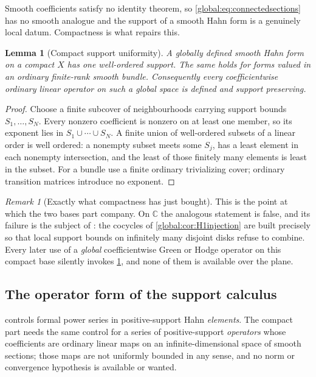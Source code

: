 \documentclass[11pt,letterpaper]{article}
\newtheorem{lemma}[lemma]{Lemma}
\theoremstyle{definition}
\theoremstyle{remark}
\newtheorem{remark}[remark]{Remark}
\newcommand{\C}{\mathbb C}
\numberwithin{equation}{section}
\begin{document}
Smooth coefficients satisfy no identity theorem, so \eqref{global:eq:connectedsections} has no smooth analogue and the support of a smooth Hahn form is a genuinely local datum. Compactness is what repairs this.

\begin{lemma}[Compact support uniformity]\label{global:lem:compactsupport}
A globally defined smooth Hahn form on a compact $X$ has one well-ordered support. The same holds for forms valued in an ordinary finite-rank smooth bundle. Consequently every coefficientwise ordinary linear operator on such a global space is defined and support preserving.
\end{lemma}

\begin{proof}
Choose a finite subcover of neighbourhoods carrying support bounds $S_1,\dots,S_N$. Every nonzero coefficient is nonzero on at least one member, so its exponent lies in $S_1\cup\cdots\cup S_N$. A finite union of well-ordered subsets of a linear order is well ordered: a nonempty subset meets some $S_j$, has a least element in each nonempty intersection, and the least of those finitely many elements is least in the subset. For a bundle use a finite ordinary trivializing cover; ordinary transition matrices introduce no exponent.
\end{proof}

\begin{remark}[Exactly what compactness has just bought]\label{global:rem:compactbought}
This is the point at which the two bases part company. On $\C$ the analogous statement is false, and its failure is the subject of : the cocycles of \cref{global:cor:H1injection} are built precisely so that local support bounds on infinitely many disjoint disks refuse to combine. Every later use of a \emph{global} coefficientwise Green or Hodge operator on this compact base silently invokes \cref{global:lem:compactsupport}, and none of them is available over the plane.
\end{remark}

\subsection{The operator form of the support calculus}

 controls formal power series in positive-support Hahn \emph{elements}. The compact part needs the same control for a series of positive-support \emph{operators} whose coefficients are ordinary linear maps on an infinite-dimensional space of smooth sections; those maps are not uniformly bounded in any sense, and no norm or convergence hypothesis is available or wanted.
\end{document}

